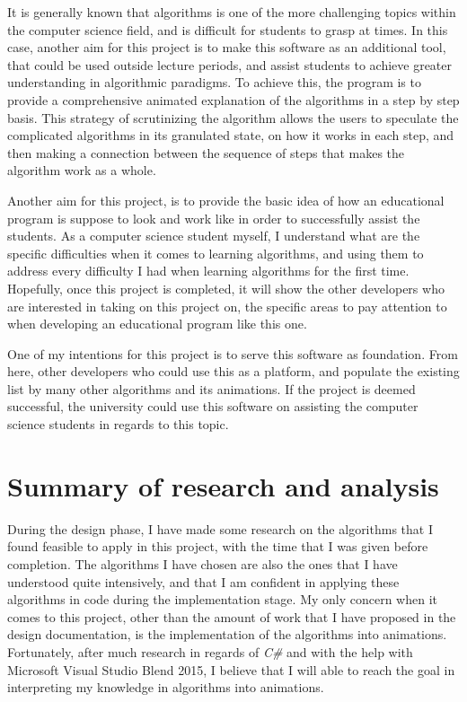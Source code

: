 It is generally known that algorithms is one of the more challenging topics within the computer science field, and is difficult for students to grasp at times. In this case, another aim for this project is to make this software as an additional tool, that could be used outside lecture periods, and assist students to achieve greater understanding in algorithmic paradigms. To achieve this, the program is to provide a comprehensive animated explanation of the algorithms in a step by step basis. This strategy of scrutinizing the algorithm allows the users to speculate the complicated algorithms in its granulated state, on how it works in each step, and then making a connection between the sequence of steps that makes the algorithm work as a whole.

Another aim for this project, is to provide the basic idea of how an educational program is suppose to look and work like in order to successfully assist the students. As a computer science student myself, I understand what are the specific difficulties when it comes to learning algorithms, and using them to address every difficulty I had when learning algorithms for the first time. Hopefully, once this project is completed, it will show the other developers who are interested in taking on this project on, the specific areas to pay attention to when developing an educational program like this one. 

One of my intentions for this project is to serve this software as foundation. From here, other developers who could use this as a platform, and populate the existing list by many other algorithms and its animations. If the project is deemed successful, the university could use this software on assisting the computer science students in regards to this topic. 

\section{Summary of research and analysis}

During the design phase, I have made some research on the algorithms that I found feasible to apply in this project, with the time that I was given before completion. The algorithms I have chosen are also the ones that I have understood quite intensively, and that I am confident in applying these algorithms in code during the implementation stage. My only concern when it comes to this project, other than the amount of work that I have proposed in the design documentation, is the implementation of the algorithms into animations. Fortunately, after much research in regards of \textit{C\#} and with the help with Microsoft Visual Studio Blend 2015, I believe that I will able to reach the goal in interpreting my knowledge in algorithms into animations.

